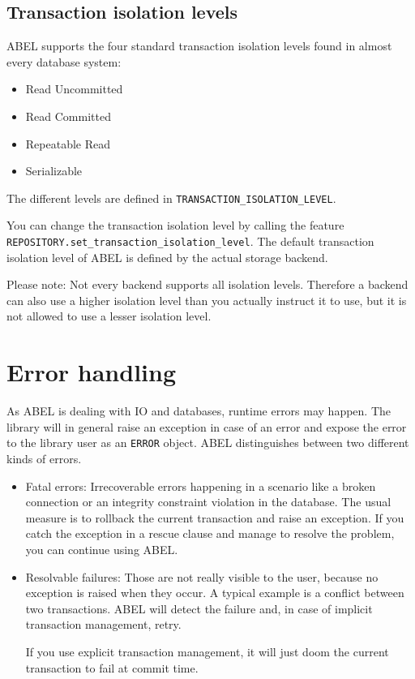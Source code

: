\subsection{Transaction isolation levels}

ABEL supports the four standard transaction isolation levels found in almost every database system:
\begin{itemize}
 \item Read Uncommitted
 \item Read Committed
 \item Repeatable Read
 \item Serializable
\end{itemize}

The different levels are defined in \lstinline!TRANSACTION_ISOLATION_LEVEL!.

You can change the transaction isolation level by calling the feature \lstinline!REPOSITORY.set_transaction_isolation_level!.
The default transaction isolation level of ABEL is defined by the actual storage backend.

Please note: Not every backend supports all isolation levels.
Therefore a backend can also use a higher isolation level than you actually instruct it to use, but it is not allowed to use a lesser isolation level.



\section{Error handling}

As ABEL is dealing with IO and databases, runtime errors may happen. 
The library will in general raise an exception in case of an error and expose the error to the library user as an \lstinline!ERROR! object.
ABEL distinguishes between two different kinds of errors.

\begin{itemize}

\item Fatal errors: Irrecoverable errors happening in a scenario like a broken connection or an integrity constraint violation in the database.
The usual measure is to rollback the current transaction and raise an exception. 
If you catch the exception in a rescue clause and manage to resolve the problem, you can continue using ABEL.

\item Resolvable failures: Those are not really visible to the user, because no exception is raised when they occur.
A typical example is a conflict between two transactions.
ABEL will detect the failure and, in case of implicit transaction management, retry.

If you use explicit transaction management, it will just doom the current transaction to fail at commit time.
\end{itemize}

